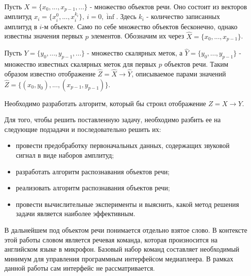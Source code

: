 Пусть $X=\{x_0, ..., x_{p-1}, ...\}$ - множество объектов речи. Оно состоит из векторов амплитуд $x_i=\{x_i^0, ..., x_i^{k_i}\},~i=\overline{0,\inf}$. Здесь $k_i$ - количество записанных амплитуд в $i$-м объекте. Само по себе множество объектов бесконечно, однако известны значения первых $p$ элементов. Обозначим их через $\widehat{X}=\{x_0, ..., x_{p-1}\}$.  

Пусть $Y=\{y_0, ..., y_{p-1}, ...\}$ - множество скалярных меток, а $\widehat{Y}=\{y_0, ..., y_{p-1}\}$ - множество известных скалярных меток для первых $p$ объектов речи. Таким образом известно отображение $\widehat{Z}=\widehat{X} \rightarrow \widehat{Y}$, описываемое парами значений $\widehat{Z}=\{(x_0, y_0), ..., (x_{p-1}, y_{p-1})\}$.

Необходимо разработать алгоритм, который бы строил отображение $Z = X \rightarrow Y$.


Для того, чтобы решить поставленную задачу, необходимо разбить ее на следующие подзадачи и последовательно решить их:
\begin{itemize}[leftmargin=2cm]
\item провести предобработку первоначальных данных, содержащих звуковой сигнал в виде наборов амплитуд;
\item разработать алгоритм распознавания объектов речи;
\item реализовать алгоритм распознавания объектов речи;
\item провести вычислительные эксперименты и выяснить, какой метод решения задачи является наиболее эффективным.
\end{itemize}


В дальнейшем под объектом речи понимается отдельно взятое слово. В контексте этой работы словом является речевая команда, которая произносится на английском языке в микрофон. Базовый набор команд составляет необходимый минимум для управления программным интерфейсом медиаплеера. В рамках данной работы сам интерфейс не рассматривается.